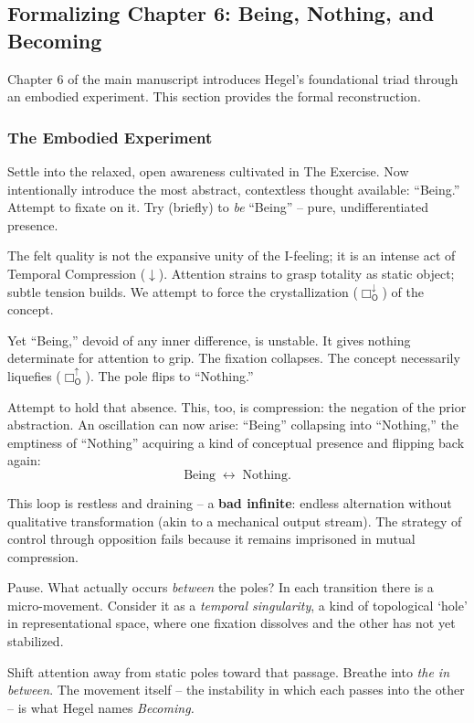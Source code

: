 \documentclass[12pt]{book}
\newcommand{\OBoxUp}{\Box_{\mathsf{O}}^{\uparrow}}
\newcommand{\OBoxDown}{\Box_{\mathsf{O}}^{\downarrow}}
\begin{document}
\subsection{Formalizing Chapter 6: Being, Nothing, and Becoming}

Chapter 6 of the main manuscript introduces Hegel's foundational triad through an embodied experiment. This section provides the formal reconstruction.

\subsubsection{The Embodied Experiment}

Settle into the relaxed, open awareness cultivated in The Exercise. Now intentionally introduce the most abstract, contextless thought available: ``Being.'' Attempt to fixate on it. Try (briefly) to \textit{be} ``Being'' -- pure, undifferentiated presence.

The felt quality is not the expansive unity of the I-feeling; it is an intense act of Temporal Compression ($\downarrow$). Attention strains to grasp totality as static object; subtle tension builds. We attempt to force the crystallization ($\OBoxDown$) of the concept.

Yet ``Being,'' devoid of any inner difference, is unstable. It gives nothing determinate for attention to grip. The fixation collapses. The concept necessarily liquefies ($\OBoxUp$). The pole flips to ``Nothing.''

Attempt to hold that absence. This, too, is compression: the negation of the prior abstraction. An oscillation can now arise: ``Being'' collapsing into ``Nothing,'' the emptiness of ``Nothing'' acquiring a kind of conceptual presence and flipping back again:
\[
    	\text{Being} \; \longleftrightarrow \; \text{Nothing}.
\]

This loop is restless and draining -- a \textbf{bad infinite}: endless alternation without qualitative transformation (akin to a mechanical output stream). The strategy of control through opposition fails because it remains imprisoned in mutual compression.

Pause. What actually occurs \textit{between} the poles? In each transition there is a micro-movement. Consider it as a \textit{temporal singularity}, a kind of topological `hole' in representational space, where one fixation dissolves and the other has not yet stabilized.

Shift attention away from static poles toward that passage. Breathe into \textit{the in between}. The movement itself -- the instability in which each passes into the other -- is what Hegel names \textit{Becoming.}
\end{document}
